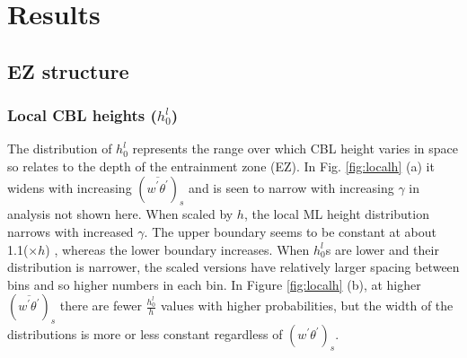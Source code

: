 \section{Results}
\subsection{EZ structure}

\subsubsection{Local CBL heights ($h_{0}^{l}$)}
\label{subsubsec:loccblh}

The distribution of $h_{0}^{l}$ represents the range over which CBL height varies in space so relates to the depth of the entrainment zone (EZ).  In Fig. \ref{fig:localh} (a) it widens with increasing $(\overline{w^{'}\theta^{'}})_{s}$ and is seen to narrow with increasing $\gamma$ in analysis not shown here.  When scaled by $h$, the local ML height distribution narrows with increased $\gamma$.  The upper boundary seems to be constant at about 1.1($\times h$) , whereas the lower boundary increases.  When $h_{0}^{l}$s are lower and their distribution is narrower, the scaled versions have relatively larger spacing between bins and so higher numbers in each bin. In Figure \ref{fig:localh} (b), at higher $(\overline{w^{'}\theta^{'}})_{s}$ there are fewer $\frac{h_{0}^{l}}{h}$ values with higher probabilities, but the width of the distributions is more or less constant regardless of $(w^{'}\theta^{'})_{s}$.\\


